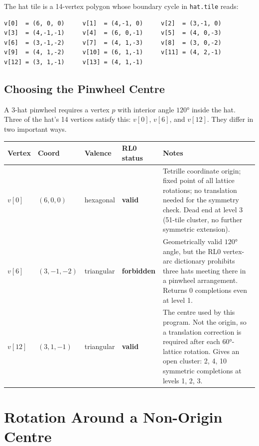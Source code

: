 \documentclass[10pt,a4paper]{article}
\let\polysection\section
\renewcommand\section{\needspace{0.16\textheight}\polysection}
\let\polysubsection\subsection
\renewcommand\subsection{\needspace{0.12\textheight}\polysubsection}
\newcommand{\file}[1]{\texttt{\footnotesize #1}}
\begin{document}
The hat tile is a 14-vertex polygon whose boundary cycle in \file{hat.tile}
reads:

\begin{verbatim}
v[0]  = (6, 0, 0)     v[1]  = (4,-1, 0)     v[2]  = (3,-1, 0)
v[3]  = (4,-1,-1)     v[4]  = (6, 0,-1)     v[5]  = (4, 0,-3)
v[6]  = (3,-1,-2)     v[7]  = (4, 1,-3)     v[8]  = (3, 0,-2)
v[9]  = (4, 1,-2)     v[10] = (6, 1,-1)     v[11] = (4, 2,-1)
v[12] = (3, 1,-1)     v[13] = (4, 1,-1)
\end{verbatim}

\subsection{Choosing the Pinwheel Centre}

A 3-hat pinwheel requires a vertex $p$ with interior angle $120°$ inside the
hat.  Three of the hat's 14 vertices satisfy this: $v[0]$, $v[6]$, and
$v[12]$.  They differ in two important ways.

\begin{center}
\begin{tabular}{@{}llllp{6cm}@{}}
\toprule
\textbf{Vertex} & \textbf{Coord} & \textbf{Valence} & \textbf{RL0 status}
  & \textbf{Notes} \\
\midrule
$v[0]$ & $(6,0,0)$ & hexagonal & \textbf{valid} &
  Tetrille coordinate origin; fixed point of all lattice rotations;
  no translation needed for the symmetry check.  Dead end at level 3
  (51-tile cluster, no further symmetric extension). \\[4pt]
$v[6]$ & $(3,-1,-2)$ & triangular & \textbf{forbidden} &
  Geometrically valid $120°$ angle, but the RL0 vertex-arc dictionary
  prohibits three hats meeting there in a pinwheel arrangement.
  Returns 0 completions even at level 1. \\[4pt]
$v[12]$ & $(3,1,-1)$ & triangular & \textbf{valid} &
  The centre used by this program.  Not the origin, so a translation
  correction is required after each $60°$-lattice rotation.
  Gives an open cluster: 2, 4, 10 symmetric completions at
  levels 1, 2, 3. \\
\bottomrule
\end{tabular}
\end{center}

\section{Rotation Around a Non-Origin Centre}
\end{document}
